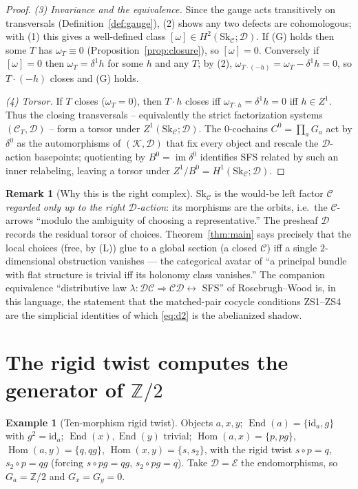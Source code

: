 \documentclass[11pt]{article}
\theoremstyle{definition}
\newtheorem{example}[theorem]{Example}
\newtheorem{remark}[theorem]{Remark}
\newcommand{\Hom}{\operatorname{Hom}}
\newcommand{\End}{\operatorname{End}}
\newcommand{\id}{\mathrm{id}}
\newcommand{\C}{\mathcal{C}}
\newcommand{\D}{\mathcal{D}}
\newcommand{\K}{\mathcal{K}}
\newcommand{\E}{\mathcal{E}}
\newcommand{\Sk}{\mathrm{Sk}}
\newcommand{\1}{\mathbf{1}}
\begin{document}
\begin{proof}
\emph{(3) Invariance and the equivalence.} Since the gauge acts transitively on
transversals (Definition~\ref{def:gauge}), (2) shows any two defects are
cohomologous; with (1) this gives a well-defined class $[\omega]\in
H^2(\Sk_\C;\D)$. If \textnormal{(G)} holds then some $T$ has $\omega_T\equiv0$
(Proposition~\ref{prop:closure}), so $[\omega]=0$. Conversely if $[\omega]=0$ then
$\omega_{T}=\delta^1 h$ for some $h$ and any $T$; by (2),
$\omega_{T\cdot(-h)}=\omega_T-\delta^1 h=0$, so $T\cdot(-h)$ closes and
\textnormal{(G)} holds.

\emph{(4) Torsor.} If $T$ closes ($\omega_T=0$), then $T\cdot h$ closes iff
$\omega_{T\cdot h}=\delta^1 h=0$ iff $h\in Z^1$. Thus the closing transversals --
equivalently the strict factorization systems $(\C_T,\D)$ -- form a torsor under
$Z^1(\Sk_\C;\D)$. The $0$-cochains $C^0=\prod_a G_a$ act by
$\delta^0$ as the automorphisms of $(\K,\D)$ that fix every object and rescale the
$\D$-action basepoints; quotienting by $B^0=\operatorname{im}\delta^0$ identifies
SFS related by such an inner relabeling, leaving a torsor under
$Z^1/B^0=H^1(\Sk_\C;\D)$.
\end{proof}

\begin{remark}[Why this is the right complex]
$\Sk_\C$ is the would-be left factor $\C$ \emph{regarded only up to the right
$\D$-action}: its morphisms are the orbits, i.e.\ the $\C$-arrows ``modulo the
ambiguity of choosing a representative.'' The presheaf $\D$ records the residual
torsor of choices. Theorem~\ref{thm:main} says precisely that the local
choices (free, by \textnormal{(L)}) glue to a global section (a closed $\C$) iff a
single $2$-dimensional obstruction vanishes --- the categorical avatar of ``a
principal bundle with flat structure is trivial iff its holonomy class vanishes.''
The companion equivalence ``distributive law $\lambda\colon\D\C\Rightarrow\C\D
\leftrightarrow$ SFS'' of Rosebrugh--Wood \cite{rw} is, in this language, the
statement that the matched-pair cocycle conditions ZS1--ZS4 \cite{pairwise} are the
simplicial identities of which \eqref{eq:d2} is the abelianized shadow.
\end{remark}

\section{The rigid twist computes the generator of $\mathbb Z/2$}

\begin{example}[Ten-morphism rigid twist]\label{ex:rt}
Objects $a,x,y$; $\End(a)=\{\id_a,g\}$ with $g^2=\id_a$; $\End(x),\End(y)$ trivial;
$\Hom(a,x)=\{p,pg\}$, $\Hom(a,y)=\{q,qg\}$, $\Hom(x,y)=\{s,s_2\}$, with the rigid
twist $s\circ p=q$, $s_2\circ p=qg$ (forcing $s\circ pg=qg$, $s_2\circ pg=q$). Take
$\D=\E$ the endomorphisms, so $G_a=\mathbb Z/2$ and $G_x=G_y=0$.
\end{example}
\end{document}
